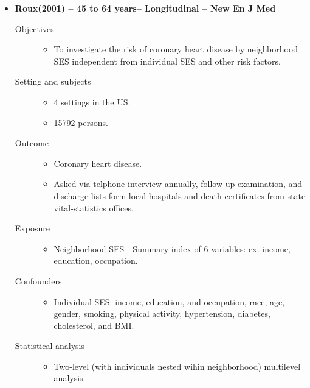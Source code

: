 \documentclass{article}
\begin{document}
\begin{itemize}	
	\item{\bf Roux(2001) -- 45 to 64 years-- Longitudinal -- New En J Med} 
		\begin{description}
			\item[Objectives]\mbox{}\par
				\begin{itemize}
					\item To investigate the risk of coronary heart disease by neighborhood SES independent from individual SES and other risk factors.
				\end{itemize}
			\item[Setting and subjects]\mbox{}\par 
				\begin{itemize}
					\item 4 settings in the US.
					\item 15792 persons.
				\end{itemize}
			\item[Outcome]\mbox{}\par
				\begin{itemize}
					\item Coronary heart disease.
					\item Asked via telphone interview annually, follow-up examination, and discharge lists form local hospitals and death certificates from state  vital-statistics offices.
				\end{itemize}
			\item[Exposure] \mbox{}\par
				\begin{itemize}
					\item Neighborhood SES - Summary index of 6 variables: ex. income, education, occupation.
				\end{itemize}
			\item[Confounders] \mbox{}\par
				\begin{itemize}
					\item Individual SES: income, education, and occupation, race, age, gender, smoking, physical activity, hypertension, diabetes, cholesterol, and BMI. 
				\end{itemize}
			\item[Statistical analysis]\mbox{}\par 
				\begin{itemize}
					\item Two-level (with individuals nested wihin neighborhood) multilevel analysis.

\end{itemize}
\end{description}
\end{itemize}
\end{document}
